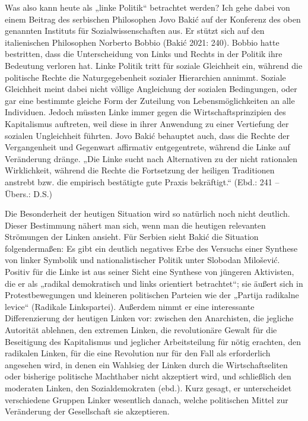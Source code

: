 \begin{multicols*}{2}
    Was also kann heute als „linke Politik“ betrachtet werden? Ich gehe dabei von einem Beitrag des serbischen Philosophen Jovo Bakić auf der Konferenz des oben genannten Instituts für Sozialwissenschaften aus. Er stützt sich auf den italienischen Philosophen Norberto Bobbio (Bakić 2021: 240). Bobbio hatte bestritten, dass die Unterscheidung von Links und Rechts in der Politik ihre Bedeutung verloren hat. Linke Politik tritt für soziale Gleichheit ein, während die politische Rechte die Naturgegebenheit sozialer Hierarchien annimmt. Soziale Gleichheit meint dabei nicht völlige Angleichung der sozialen Bedingungen, oder gar eine bestimmte gleiche Form der Zuteilung von Lebensmöglichkeiten an alle Individuen.  Jedoch müssten Linke immer gegen die Wirtschaftsprinzipien des Kapitalismus auftreten, weil diese in ihrer Anwendung zu einer Vertiefung der sozialen Ungleichheit führten. Jovo Bakić behauptet auch, dass die Rechte der Vergangenheit und Gegenwart affirmativ entgegentrete, während die Linke auf Veränderung dränge. „Die Linke sucht nach Alternativen zu der nicht rationalen Wirklichkeit, während die Rechte die Fortsetzung der heiligen Traditionen anstrebt bzw. die empirisch bestätigte gute Praxis bekräftigt.“ (Ebd.: 241 – Übers.: D.S.) 

    Die Besonderheit der heutigen Situation wird so natürlich noch nicht deutlich. Dieser Bestimmung nähert man sich, wenn man die heutigen relevanten Strömungen der Linken ansieht. Für Serbien sieht Bakić die Situation folgendermaßen: Es gibt ein deutlich negatives Erbe des Versuchs einer Synthese von linker Symbolik und nationalistischer Politik unter Slobodan Milošević. Positiv für die Linke ist aus seiner Sicht eine Synthese von jüngeren Aktivisten, die er als „radikal demokratisch und links orientiert betrachtet“; sie äußert sich in Protestbewegungen und kleineren politischen Parteien wie der „Partija radikalne levice“ (Radikale Linkspartei). Außerdem nimmt er eine interessante Differenzierung der heutigen Linken vor: zwischen den Anarchisten, die jegliche Autorität ablehnen, den extremen Linken, die revolutionäre Gewalt für die Beseitigung des Kapitalismus und jeglicher Arbeitsteilung für nötig erachten, den radikalen Linken, für die eine Revolution nur für den Fall als erforderlich angesehen wird, in denen ein Wahlsieg der Linken durch die Wirtschaftseliten oder bisherige politische Machthaber nicht akzeptiert wird, und schließlich den moderaten Linken, den Sozialdemokraten (ebd.). Kurz gesagt, er unterscheidet verschiedene Gruppen Linker wesentlich danach, welche politischen Mittel zur Veränderung der Gesellschaft sie akzeptieren. 


\end{multicols*}
